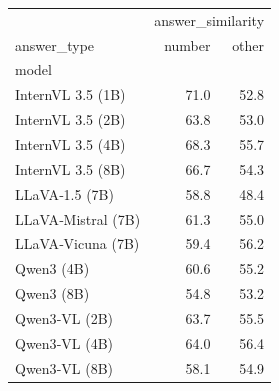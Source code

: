 \begin{tabular}{lrr}
\toprule
 & \multicolumn{2}{r}{answer_similarity} \\
answer_type & number & other \\
model &  &  \\
\midrule
InternVL 3.5 (1B) & 71.0 & 52.8 \\
InternVL 3.5 (2B) & 63.8 & 53.0 \\
InternVL 3.5 (4B) & 68.3 & 55.7 \\
InternVL 3.5 (8B) & 66.7 & 54.3 \\
LLaVA‑1.5 (7B) & 58.8 & 48.4 \\
LLaVA‑Mistral (7B) & 61.3 & 55.0 \\
LLaVA‑Vicuna (7B) & 59.4 & 56.2 \\
Qwen3 (4B) & 60.6 & 55.2 \\
Qwen3 (8B) & 54.8 & 53.2 \\
Qwen3‑VL (2B) & 63.7 & 55.5 \\
Qwen3‑VL (4B) & 64.0 & 56.4 \\
Qwen3‑VL (8B) & 58.1 & 54.9 \\
\bottomrule
\end{tabular}
